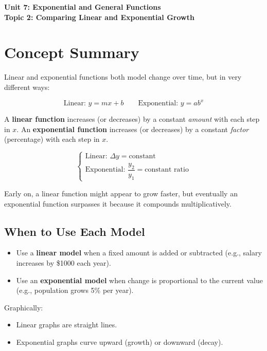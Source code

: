 \documentclass[12pt]{article}
\begin{document}
\begin{center}
    \LARGE \textbf{Unit 7: Exponential and General Functions} \\[6pt]
    \Large \textbf{Topic 2: Comparing Linear and Exponential Growth}
\end{center}

\vspace{1em}

\section*{Concept Summary}

Linear and exponential functions both model change over time, but in very different ways:

\[
\text{Linear: } y = mx + b \qquad \text{Exponential: } y = a b^x
\]

A \textbf{linear function} increases (or decreases) by a constant \emph{amount} with each step in \(x\).  
An \textbf{exponential function} increases (or decreases) by a constant \emph{factor} (percentage) with each step in \(x\).

\[
\begin{cases}
\text{Linear: } \Delta y = \text{constant} \\
\text{Exponential: } \dfrac{y_2}{y_1} = \text{constant ratio}
\end{cases}
\]

Early on, a linear function might appear to grow faster, but eventually an exponential function surpasses it because it compounds multiplicatively.

\subsection*{When to Use Each Model}
\begin{itemize}
  \item Use a \textbf{linear model} when a fixed amount is added or subtracted (e.g., salary increases by \$1000 each year).
  \item Use an \textbf{exponential model} when change is proportional to the current value (e.g., population grows 5\% per year).
\end{itemize}

Graphically:
\begin{itemize}
  \item Linear graphs are straight lines.
  \item Exponential graphs curve upward (growth) or downward (decay).
\end{itemize}
\end{document}

